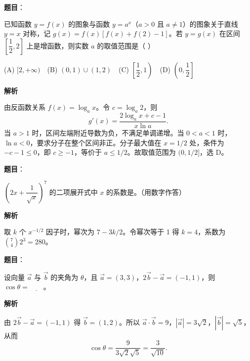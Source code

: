 \begin{answer}

\textbf{题目}：

已知函数 \(y=f(x)\) 的图象与函数 \(y=a^x\)（\(a>0\) 且 \(a\ne1\)）的图象关于直线 \(y=x\) 对称，记 \(g(x)=f(x)[f(x)+f(2)-1]\)。若 \(y=g(x)\) 在区间 \(\left[\dfrac12,2\right]\) 上是增函数，则实数 \(a\) 的取值范围是（  ）

(A) \([2,+\infty)\)　(B) \((0,1)\cup(1,2)\)　(C) \(\left[\dfrac12,1\right)\)　(D) \(\left(0,\dfrac12\right]\)

\textbf{解析}

由反函数关系 \(f(x)=\log_a x\)。令 \(c=\log_a2\)，则
\nopagebreak[4]
\[
g'(x)=\frac{2\log_a x+c-1}{x\ln a}.
\]
当 \(a>1\) 时，区间左端附近导数为负，不满足单调递增。当 \(0<a<1\) 时，\(\ln a<0\)，要求分子在整个区间非正。分子最大值在 \(x=1/2\) 处，条件为 \(-c-1\le0\)，即 \(c\ge-1\)，等价于 \(a\le1/2\)。故取值范围为 \((0,1/2]\)，选 D。

\gkanswer{答案：D（\((0,1/2]\)）。}

\end{answer}
\begin{answer}

\textbf{题目}：

\(\left(2x+\dfrac1{\sqrt{x}}\right)^7\) 的二项展开式中 \(x\) 的系数是\gkblank{}。（用数字作答）

\textbf{解析}

取 \(k\) 个 \(x^{-1/2}\) 因子时，幂次为 \(7-3k/2\)。令幂次等于 1 得 \(k=4\)，系数为 \(\binom74 2^3=280\)。


\end{answer}
\begin{answer}

\textbf{题目}：

设向量 \(\vec a\) 与 \(\vec b\) 的夹角为 \(\theta\)，且 \(\vec a=(3,3)\)，\(2\vec b-\vec a=(-1,1)\)，则 \(\cos\theta=\underline{\qquad}\)。

\textbf{解析}

由 \(2\vec b-\vec a=(-1,1)\) 得 \(\vec b=(1,2)\)。所以 \(\vec a\cdot\vec b=9\)，\(|\vec a|=3\sqrt2\)，\(|\vec b|=\sqrt5\)，从而
\nopagebreak[4]
\[
\cos\theta=\frac{9}{3\sqrt2\sqrt5}=\frac3{\sqrt{10}}.
\]


\end{answer}
